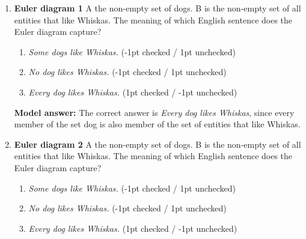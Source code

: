 \documentclass[a4,11pt]{article}
\begin{document}
\begin{enumerate}[leftmargin = 12pt]

\item {\bf Euler diagram 1} A  the non-empty set of dogs. B is the non-empty set of all entities that like Whiskas. The meaning of which English sentence does the Euler diagram capture?



      \begin{enumerate}[noitemsep]
        \item \textit{Some dogs like Whiskas.} (-1pt checked / 1pt unchecked)
	\item \textit{No dog likes Whiskas.} (-1pt checked / 1pt unchecked)
        \item \textit{Every dog likes Whiskas.} (1pt checked / -1pt unchecked)
	\end{enumerate}	


{\bf Model answer:}  The correct answer is \textit{Every dog likes Whiskas}, since every member of the set dog is also member of the set of entities that like Whiskas.

\item {\bf Euler diagram 2} A  the non-empty set of dogs. B is the non-empty set of all entities that like Whiskas. The meaning of which English sentence does the Euler diagram capture?


      \begin{enumerate}[noitemsep]
        \item \textit{Some dogs like Whiskas.} (-1pt checked / 1pt unchecked)
	\item \textit{No dog likes Whiskas.} (-1pt checked / 1pt unchecked)
        \item \textit{Every dog likes Whiskas.} (1pt checked / -1pt unchecked)
	\end{enumerate}	



\end{enumerate}
\end{document}
